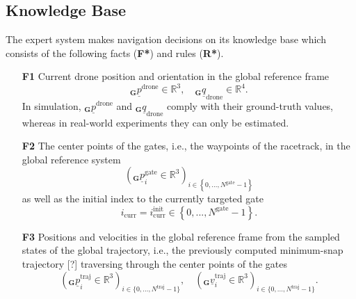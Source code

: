 \subsection*{Knowledge Base}
The expert system makes navigation decisions on its knowledge base
which consists of the following facts (\textbf{F*}) and rules (\textbf{R*}).
\begin{itemize}
    \item [\textbf{F1}] Current drone position and orientation
    in the global reference frame
    \begin{equation}
        {}_\textbf{G} \underline p^\text{drone} \in \mathbb{R}^3,
        \quad 
        {}_\textbf{G} \underline q_\text{drone} \in \mathbb{R}^4.
    \end{equation}
    In simulation,
    ${}_\textbf{G} \underline p^\text{drone}$ 
    and 
    ${}_\textbf{G} \underline q_\text{drone}$
    comply with their ground-truth values,
    whereas in real-world experiments
    they can only be estimated.

    \item [\textbf{F2}] The center points of the gates,
    i.e., the waypoints of the racetrack, 
    in the global reference system
    \begin{equation}
        \left( {}_\textbf{G} \underline p^\text{gate}_{i}  \in \mathbb{R}^3\right)
        _{i \in \left\{0, ..., N^\text{gate} - 1 \right\}}
    \end{equation}
    as well as the initial index to the currently targeted gate
    \begin{equation}
        i_\text{curr} = i_\text{curr}^\text{init}
        \in \left\{0, ..., N^\text{gate} - 1 \right\}.
    \end{equation}
    \item [\textbf{F3}] Positions and velocities 
    in the global reference frame
    from the sampled states of the global trajectory,
    i.e., the previously computed minimum-snap trajectory [?] 
    traversing through the center points of the gates
    \begin{equation}
        \left( {}_\textbf{G} \underline p^\text{traj}_i \in \mathbb{R}^3 \right)
        _{i \in \{0, ..., N^\text{traj}-1\}},
        \quad
        \left( {}_\textbf{G} \underline v^\text{traj}_i \in \mathbb{R}^3 \right)
        _{i \in \{0, ..., N^\text{traj}-1\}}.
    \end{equation}


\end{itemize}
